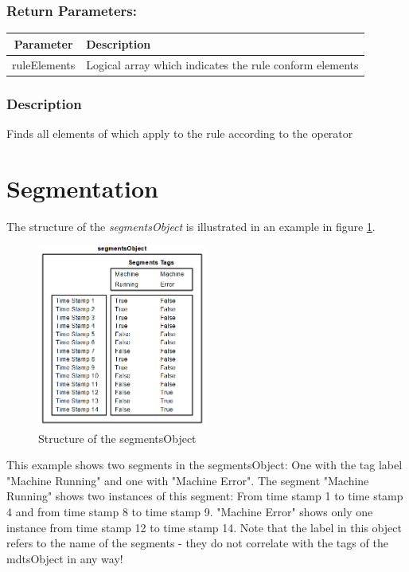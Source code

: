 \documentclass[a4]{scrreprt}
\begin{document}
\subsubsection{Return Parameters:}

\begin{longtabu} to \textwidth {|c|X|}
	\hline
	\textbf{Parameter} & \textbf{Description} \\ \hline
	\endhead
	ruleElements & Logical array which indicates the rule conform elements \\ \hline
\end{longtabu}

\subsubsection{Description}

Finds all elements of which apply to the rule according to the operator

\section{Segmentation}

The structure of the \textit{segmentsObject} is illustrated in an example in figure \ref{FigSegmentsObjectStructure}.

\begin{figure}[htbp]
	\centering
	\includegraphics[width=0.5\textwidth]{Media/segmentsObjectStructure.png}
	\caption{Structure of the segmentsObject}
	\label{FigSegmentsObjectStructure}
\end{figure}

This example shows two segments in the segmentsObject: One with the tag label "Machine Running" and one with "Machine Error". The segment "Machine Running" shows two instances of this segment: From time stamp 1 to time stamp 4 and from time stamp 8 to time stamp 9. "Machine Error" shows only one instance from time stamp 12 to time stamp 14. Note that the label in this object refers to the name of the segments - they do not correlate with the tags of the mdtsObject in any way!
\end{document}
